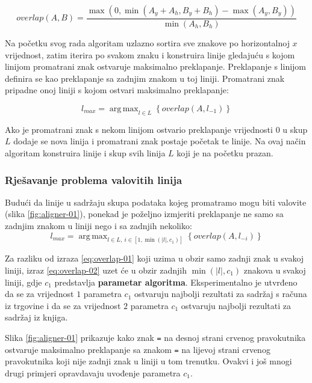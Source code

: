\documentclass[times, utf8, zavrsni]{fer}
\DeclareMathOperator*{\argmax}{arg\,max}
\begin{document}
\begin{equation}
\label{eq:overlap}
\textit{overlap}(A, B) =
\frac{\max(0, \min( A_y + A_h, B_y + B_h ) - \max( A_y, B_y ))}{\min(A_h, B_h)}
\end{equation}

Na početku svog rada algoritam uzlazno sortira sve znakove po horizontalnoj $x$
vrijednost, zatim iterira po svakom znaku i konstruira linije gledajuću s kojom
linijom promatrani znak ostvaruje maksimalno preklapanje. Preklapanje s linijom
definira se kao preklapanje sa zadnjim znakom u toj liniji. Promatrani znak
pripadne onoj liniji s kojom ostvari maksimalno preklapanje:

\begin{equation}
\label{eq:overlap-01}
l_{max} = \argmax_{l \in L}\left\{\textit{overlap}(A, l_{-1})\right\}
\end{equation}

Ako je promatrani znak s nekom linijom ostvario preklapanje vrijednosti $0$
u skup $L$ dodaje se nova linija i promatrani znak postaje početak te linije.
Na ovaj način algoritam konstruira linije i skup svih linija $L$ koji je na
početku prazan.


\subsubsection{Rješavanje problema valovitih linija}
Budući da linije u sadržaju skupa podataka kojeg promatramo mogu biti valovite
(slika \ref{fig:aligner-01}), ponekad je poželjno izmjeriti preklapanje ne samo
sa zadnjim znakom u liniji nego i sa zadnjih nekoliko:
\begin{equation}
\label{eq:overlap-02}
l_{max} = \argmax_{l \in L,\ i \in [1, \min(|l|, c_1)]}\left\{\textit{overlap}(A, l_{-i})\right\}
\end{equation}

Za razliku od izraza \ref{eq:overlap-01} koji uzima u obzir samo zadnji znak u
svakoj liniji, izraz \ref{eq:overlap-02} uzet će u obzir zadnjih
$\min(|l|, c_1)$
znakova u svakoj liniji, gdje $c_1$ predstavlja \textbf{parametar algoritma}. Eksperimentalno je utvrđeno da se za vrijednost $1$ parametra $c_1$ ostvaruju najbolji rezultati za sadržaj s računa iz trgovine i da se za vrijednost $2$ parametra $c_1$ ostvaruju najbolji rezultati za sadržaj iz knjiga.

Slika \ref{fig:aligner-01} prikazuje kako znak \lstinline{=} na desnoj strani
crvenog pravokutnika ostvaruje maksimalno preklapanje sa znakom \lstinline{=}
na lijevoj strani crvenog pravokutnika koji nije zadnji znak u liniji u tom
trenutku. Ovakvi i još mnogi drugi primjeri opravdavaju uvođenje parametra
$c_1$.
\end{document}
